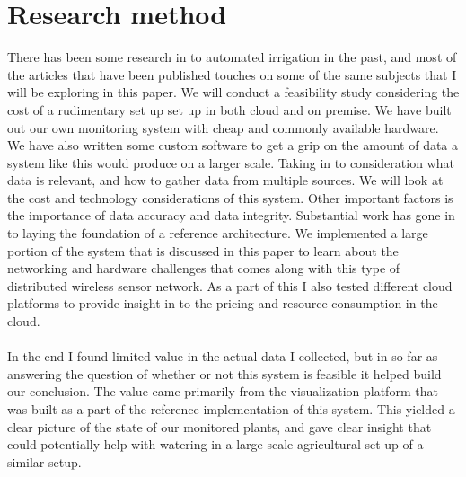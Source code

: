 \documentclass[]{uiophd}
\begin{document}
\section{Research method}
There has been some research in to automated irrigation in the past, and most of the articles that have been published touches on some of the same subjects that I will be exploring in this paper. We will conduct a feasibility study considering the cost of a rudimentary set up set up in both cloud and on premise. We have built out our own monitoring system with cheap and commonly available hardware. We have also written some custom software to get a grip on the amount of data a system like this would produce on a larger scale. Taking in to consideration what data is relevant, and how to gather data from multiple sources. We will look at the cost and technology considerations of this system. Other important factors is the importance of data accuracy and data integrity. Substantial work has gone in to laying the foundation of a reference architecture. We implemented a large portion of the system that is discussed in this paper to learn about the networking and hardware challenges that comes along with this type of distributed wireless sensor network. As a part of this I also tested different cloud platforms to provide insight in to the pricing and resource consumption in the cloud. 
\\\\
In the end I found limited value in the actual data I collected, but in so far as answering the question of whether or not this system is feasible it helped build our conclusion. The value came primarily from the visualization platform that was built as a part of the reference implementation of this system. This yielded a clear picture of the state of our monitored plants, and gave clear insight that could potentially help with watering in a large scale agricultural set up of a similar setup.
\end{document}
